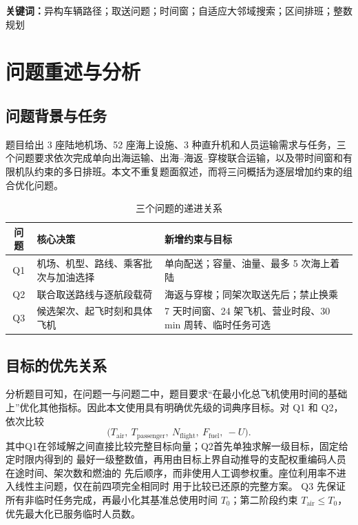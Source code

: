 \documentclass[UTF8,a4paper,zihao=5]{ctexart}
\begin{document}
\vspace{0.8em}
\noindent\textbf{关键词：}异构车辆路径；取送问题；时间窗；自适应大邻域搜索；区间排班；整数规划

\clearpage

\section{问题重述与分析}

\subsection{问题背景与任务}
题目给出 3 座陆地机场、52 座海上设施、3 种直升机和人员运输需求与任务，三个问题要求依次完成单向出海运输、出海--海返--穿梭联合运输，以及带时间窗和有限机队约束的多日排班。本文不重复题面叙述，而将三问概括为逐层增加约束的组合优化问题。

\begin{table}[htbp]
  \centering
  \caption{三个问题的递进关系}
  \label{tab:question-relation}
  \begin{tabularx}{\linewidth}{c X X}
    \toprule
    问题 & 核心决策 & 新增约束与目标 \\
    \midrule
    Q1 & 机场、机型、路线、乘客批次与加油选择 & 单向配送；容量、油量、最多 5 次海上着陆\\
    Q2 & 联合取送路线与逐航段载荷 & 海返与穿梭；同架次取送先后；禁止换乘\\
    Q3 & 候选架次、起飞时刻和具体飞机 & 7 天时间窗、24 架飞机、营业时段、30 min 周转、临时任务可选 \\
    \bottomrule
  \end{tabularx}
\end{table}

\subsection{目标的优先关系}
分析题目可知，在问题一与问题二中，题目要求“在最小化总飞机使用时间的基础上”优化其他指标。因此本文使用具有明确优先级的词典序目标。对 Q1 和 Q2，依次比较
\begin{equation}
  \bigl(T_{\mathrm{air}},\ T_{\mathrm{passenger}},\ N_{\mathrm{flight}},\
  F_{\mathrm{fuel}},\ -U\bigr).
  \label{eq:lexicographic}
\end{equation}
其中Q1在邻域解之间直接比较完整目标向量；Q2首先单独求解一级目标，固定给定时限内得到的
最好一级整数值，再用由目标上界自动推导的支配权重编码人员在途时间、架次数和燃油的
先后顺序，而非使用人工调参权重。座位利用率不进入线性主问题，仅在前四项完全相同时
用于比较已还原的完整方案。
Q3 先保证所有非临时任务完成，再最小化其基准总使用时间 $T_0$；第二阶段约束 $T_{\mathrm{air}}\le T_0$，优先最大化已服务临时人员数。
\end{document}
